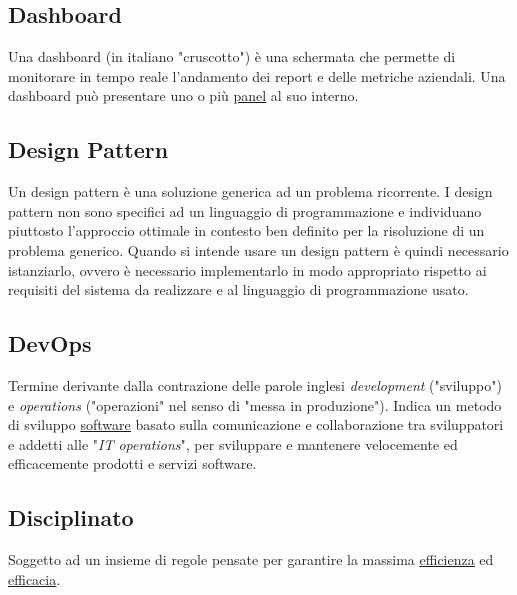 

	\subsection{Dashboard}
	\label{sec:dashboard}
	Una dashboard (in italiano "cruscotto") è una schermata che permette di monitorare in tempo reale l’andamento dei report e delle metriche aziendali. Una dashboard può presentare uno o più \underline{\hyperref[sec:panel]{panel}} al suo interno.

	\subsection{Design Pattern}
	\label{sec:designpatter}
	Un design pattern è una soluzione generica ad un problema ricorrente. I design pattern non sono specifici ad un linguaggio di programmazione e individuano piuttosto l'approccio ottimale in contesto ben definito per la risoluzione di un problema generico. Quando si intende usare un design pattern è quindi necessario istanziarlo, ovvero è necessario implementarlo in modo appropriato rispetto ai requisiti del sistema da realizzare e al linguaggio di programmazione usato.

	\subsection{DevOps}
	\label{sec:devops}
	Termine derivante dalla contrazione delle parole inglesi \emph{development} ("sviluppo") e \emph{operations} ("operazioni" nel senso di "messa in produzione"). Indica un metodo di sviluppo \underline{\hyperref[sec:prodottosoftware]{software}} basato sulla comunicazione e collaborazione tra sviluppatori e addetti alle "\emph{IT operations}", per sviluppare e mantenere velocemente ed efficacemente prodotti e servizi software.


	\subsection{Disciplinato}
	\label{sec:disciplinato}
	Soggetto ad un insieme di regole pensate per garantire la massima \underline{\hyperref[sec:efficienza]{efficienza}} ed \underline{\hyperref[sec:efficacia]{efficacia}}.

